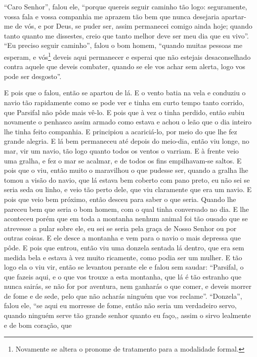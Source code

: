 “Caro Senhor”, falou ele, “porque quereis seguir caminho tão logo:
seguramente, vossa fala e vossa companhia me aprazem tão bem que nunca
desejaria apartar-me de vós, e por Deus, se puder ser, assim permanecei comigo
ainda hoje; quando tanto quanto me dissestes, creio que tanto melhor deve ser
meu dia que eu vivo”. “Eu preciso seguir caminho”, falou o bom homem, “quando
muitas pessoas me esperam, e vós\footnote{ Novamente se altera o pronome de
tratamento para a modalidade formal.}  deveis aqui permanecer e
esperai que não estejais desaconselhado contra aquele que deveis combater,
quando se ele vos achar sem alerta, logo vos pode ser desgosto”.

 E pois que o falou, então se apartou de lá. E o vento batia na vela e
conduziu o navio tão rapidamente como se pode ver e tinha em curto tempo tanto
corrido, que Parsifal não pôde mais vê-lo. E pois que à vez o tinha perdido,
então subiu novamente o penhasco assim armado como estava e achou o leão que o
dia inteiro lhe tinha feito companhia. E principiou a acariciá-lo, por meio do
que lhe fez grande alegria. E lá bem permaneceu até depois do meio-dia, então
viu longe, no mar, vir um navio, tão logo quanto todos os ventos o varriam. E à
frente veio uma gralha, e fez o mar se acalmar, e de todos os fins
empilhavam-se saltos. E pois que o viu, então muito o maravilhou o que pudesse
ser, quando a gralha lhe tomou a visão do navio, que lá estava bem coberto com
pano preto, eu não sei se seria seda ou linho,  e veio tão perto dele,
que viu claramente que era um navio. E pois que veio bem próximo, então desceu
para saber o que seria. Quando lhe pareceu bem que seria o bom homem, com o
qual tinha conversado no dia. E lhe aconteceu porém que em toda a montanha
nenhum animal foi tão ousado que se atrevesse a pular sobre ele, eu sei se
seria pela graça de Nosso Senhor ou por outras coisas. E ele desce a montanha e
vem para o navio o mais depressa que pôde. E pois que entrou, então viu uma
donzela sentada lá dentro, que era sem medida bela e estava à vez muito
ricamente, como podia ser um mulher. E tão logo ela o viu vir, então se
levantou perante ele e falou sem saudar: “Parsifal, o que fazeis aqui, e o que
vos trouxe a esta montanha, que lá é tão estranho que nunca sairás, se não for
por aventura, nem ganharás o que comer, e deveis morrer de fome e de sede, pelo
que não acharás ninguém que vos reclame”. “Donzela”, falou ele, “se aqui eu
morresse de fome, então não seria um verdadeiro servo, quando ninguém serve tão
grande senhor quanto eu faço,,  assim o sirvo lealmente e de bom coração, que
